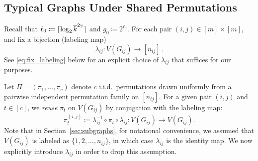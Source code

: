 \documentclass[journal]{IEEEtran}
\theoremstyle{definition}
\theoremstyle{definition}
\newcommand{\PV}{\nu}
\newcommand{\kb}{\overline{k}}
\DeclarePairedDelimiter\ceil{\lceil}{\rceil}
\begin{document}
\subsection{Typical Graphs Under Shared Permutations}
\label{sec:typical_graph_permuation}

Recall that \(\ell_0 \coloneqq \ceil{\log_2 \kb^{2\gamma}}\) and \(g_0 \coloneqq 2^{\ell_0}\). For each pair \((i,j) \in [m] \times [m]\), and fix a bijection (labeling map)
\[
  \lambda_{ij}: V(G_{ij}) \to [n_{ij}] \, .
\]
See \eqref{eq:fix_labeling} below for an explicit choice of $\lambda_{ij}$ that suffices for our purposes.

Let \(\Pi = (\pi_1,\ldots,\pi_c)\) denote \(c\) i.i.d.\ permutations drawn uniformly from a pairwise independent permutation family on \([n_{ij}]\).
For a given pair \((i,j)\) and \(t\in[c]\), we \emph{reuse} \(\pi_t\) on \(V(G_{ij})\) by conjugation with the labeling map:
\[
  \pi_t^{(i,j)} \coloneqq \lambda_{ij}^{-1}\circ \pi_t \circ \lambda_{ij} : V(G_{ij}) \to V(G_{ij}).
\]
Note that in Section~\ref{sec:subgraphs}, for notational convenience, we assumed that
\(V(G_{ij})\) is labeled as \(\{1,2,\dots,n_{ij}\}\), in which case \(\lambda_{ij}\) is the identity map.
We now explicitly introduce \(\lambda_{ij}\) in order to drop this assumption.
\end{document}
